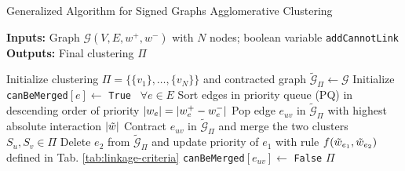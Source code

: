 \begin{algorithm}[t]
  \caption{Generalized Algorithm for Signed Graphs Agglomerative Clustering}
   \hspace*{\algorithmicindent} \textbf{Inputs:} Graph $\mathcal{G}(V,E,w^+,w^-)$ with $N$ nodes; boolean variable {\color{blue}\texttt{addCannotLink}}  \\
  \hspace*{\algorithmicindent} \textbf{Outputs:} Final clustering $\Pi$\\
  \hspace*{\algorithmicindent} 
  \begin{algorithmic}[1]
      \State Initialize clustering $\Pi=\{\{v_1\}, \ldots, \{v_N\}\}$ and contracted graph $\tilde{\mathcal{G}}_\Pi \gets \mathcal{G}$
      \State Initialize \texttt{canBeMerged}$[e] \gets$ \texttt{True} $\,\,\, \forall e\in E$
      \State Sort edges in priority queue (PQ) in descending order of priority $|w_e|=|w^+_e - w^-_e|$ 
      \State
        \State Pop edge $e_{uv}$ in $\tilde{\mathcal{G}}_\Pi$ with highest absolute interaction $|\tilde{w}|$
          \State Contract $e_{uv}$ in $\tilde{\mathcal{G}}_\Pi$ and merge the two clusters $S_u,S_v \in \Pi$
            \State Delete $e_2$ from $\tilde{\mathcal{G}}_\Pi$ and update priority of $e_1$ with rule $f(\tilde{w}_{e_1},\tilde{w}_{e_2})$ defined in Tab. \ref{tab:linkage-criteria} 
          \EndFor
        \EndIf
          \State \texttt{canBeMerged}$[e_{uv}] \gets$ \texttt{False}
        \EndIf
      \EndWhile
      \State
      \Return $\Pi$
  \end{algorithmic}
  \label{main_alg_suppl}
\end{algorithm}

